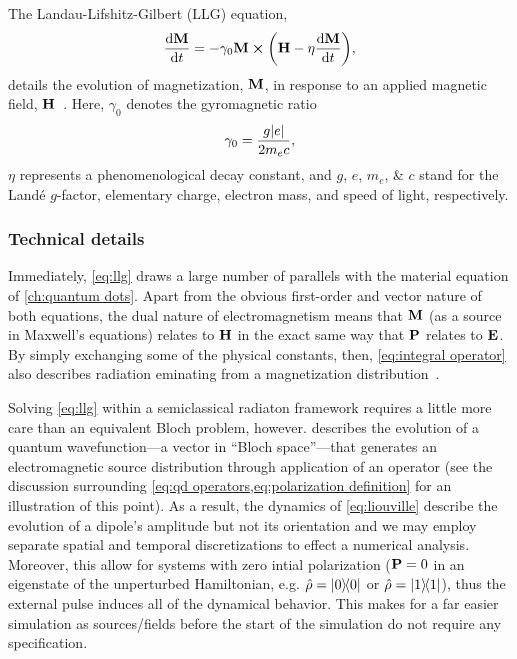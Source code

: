 The Landau-Lifshitz-Gilbert (LLG) equation,
\begin{equation}
  \dv{\vb{M}}{t} = -\gamma_0 \vb{M} \cp \qty(\vb{H} - \eta \dv{\vb{M}}{t}),
  \label{eq:llg}
\end{equation}
details the evolution of magnetization, $\vb{M}$, in response to an applied magnetic field, $\vb{H}$~\cite{Aharoni2000}.
Here, $\gamma_0$ denotes the gyromagnetic ratio
\begin{equation}
  \gamma_0 = \frac{g \abs{e}}{2 m_e c},
  \label{eq:gyro}
\end{equation}
$\eta$ represents a phenomenological decay constant, and $g$, $e$, $m_e$, \& $c$ stand for the Land\'e $g$-factor, elementary charge, electron mass, and speed of light, respectively.

\subsubsection{Technical details}

Immediately, \cref{eq:llg} draws a large number of parallels with the material equation of  \cref{ch:quantum dots}.
Apart from the obvious first-order and vector nature of both equations, the dual nature of electromagnetism means that $\vb{M}$ (as a source in Maxwell's equations) relates to $\vb{H}$ in the exact same way that $\vb{P}$ relates to $\vb{E}$.
By simply exchanging some of the physical constants, then, \cref{eq:integral operator} also describes radiation eminating from a magnetization distribution~\cite{Rothwell2009}.

Solving \cref{eq:llg} within a semiclassical radiaton framework requires a little more care than an equivalent Bloch problem, however.
 describes the evolution of a quantum wavefunction---a vector in ``Bloch space''---that generates an electromagnetic source distribution through application of an operator (see the discussion surrounding \cref{eq:qd operators,eq:polarization definition} for an illustration of this point).
As a result, the dynamics of \cref{eq:liouville} describe the evolution of a dipole's amplitude but not its orientation and we may employ separate spatial and temporal discretizations to effect a numerical analysis.
Moreover, this allow for systems with zero intial polarization ($\vb{P} = 0$ in an eigenstate of the unperturbed Hamiltonian, e.g. $\hat{\rho} = \op{0}{0}$ or $\hat{\rho} = \op{1}{1}$), thus the external pulse induces all of the dynamical behavior.
This makes for a far easier simulation as sources/fields before the start of the simulation do not require any specification.

